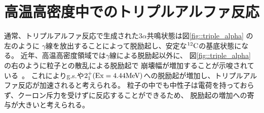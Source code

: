 \section{高温高密度中でのトリプルアルファ反応}
\label{seq::triplealphareaction}
通常、トリプルアルファ反応で生成された$3\alpha$共鳴状態は図\ref{fig::triple_alpha} の左のように
$\gamma$線を放出することによって脱励起し、安定な${}^{12}{\rm C}$の基底状態になる。
近年、高温高密度領域では$\gamma$線による脱励起以外に、
図\ref{fig::triple_alpha} の右のように粒子との散乱による脱励起で
崩壊幅が増加することが示唆されている~\cite{hotdensemedium}。
これによりg.s.や$2_{1}^{+} ({\rm Ex} = 4.44 {\rm MeV}) $への脱励起が増加し、トリプルアルファ反応が加速されると考えられる。
粒子の中でも中性子は電荷を持っておらず、クーロン斥力を受けずに反応することができるため、
脱励起の増加への寄与が大きいと考えられる。



